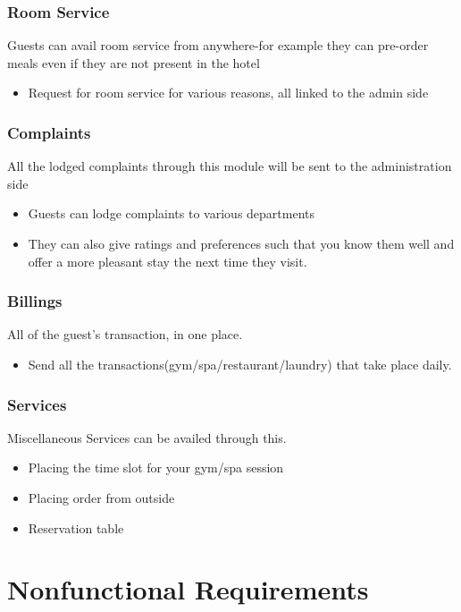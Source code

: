 \documentclass{scrreprt}
\begin{document}
\subsection{Room Service}
Guests can avail room service from anywhere-for example they can pre-order meals even if they are not present in the hotel
\begin{itemize}
\item Request for room service for various reasons, all linked to the admin side
\end{itemize}

\subsection{Complaints}
All the lodged complaints through this module will be sent to the administration side
\begin{itemize}
    \item Guests can lodge complaints to various departments
    \item They can also give ratings and preferences such that you know them well and offer a more pleasant stay the next time they visit.
\end{itemize}

\subsection{Billings}
All of the guest's transaction, in one place.
\begin{itemize}
    \item Send all the transactions(gym/spa/restaurant/laundry) that take place daily.
\end{itemize}

\subsection{Services}
Miscellaneous Services can be availed through this.
\begin{itemize}
    \item Placing the time slot for your gym/spa session
    \item Placing order from outside
    \item Reservation table
\end{itemize}


\chapter{Nonfunctional Requirements}
\end{document}
